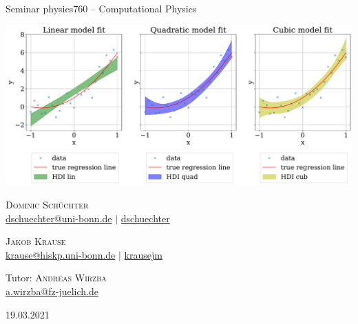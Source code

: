 \documentclass[11pt,aspectratio=1610,dvipsnames]{beamer}
\begin{document}
\begin{frame}[plain]
	\setcounter{page}{0}
	\centering
	{\Large {}}\\
	{Seminar physics760 -- Computational Physics}
	\vfill
	
	\includegraphics[width=0.5\linewidth]{HDI_sigma_07a}
	\vfill
	\begin{minipage}{\linewidth}
		\centering
		\begin{minipage}{0.45\linewidth}
			\centering
			\textsc{Dominic Schüchter}\\
			\scriptsize \href{mailto:dschuechter@uni-bonn.de}{\faEnvelope  \hspace*{0.1cm}dschuechter@uni-bonn.de} {\color{black}$|$} \href{https://github.com/dschuechter}{\faGithub  \hspace*{0.1cm}dschuechter}\\
		\end{minipage}
		\begin{minipage}{0.45\linewidth}
			\centering
			\textsc{Jakob Krause}\\
			\scriptsize \href{mailto:krause@hiskp.uni-bonn.de}{\faEnvelope  \hspace*{0.1cm}krause@hiskp.uni-bonn.de} {\color{black}$|$} \href{https://github.com/krausejm}{\faGithub  \hspace*{0.1cm}krausejm}\\
		\end{minipage}
	\vspace{.5cm}
	
	Tutor: \textsc{Andreas Wirzba}\\
	\scriptsize \href{mailto:a.wirzba@fz-juelich.de}{\faEnvelope  \hspace*{0.1cm}a.wirzba@fz-juelich.de}
	\end{minipage}
	\vspace{0.5cm}
	
	19.03.2021
	 
	
 		
\end{frame}
\end{document}
